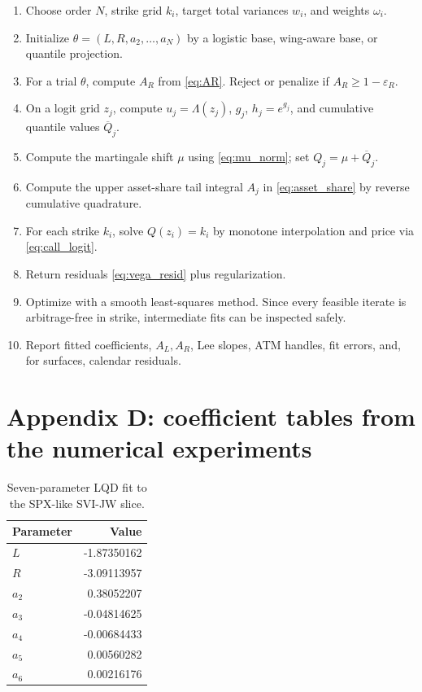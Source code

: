 \documentclass[11pt]{article}
\newcommand{\1}{\mathbf{1}}
\newcommand{\eps}{\varepsilon}
\begin{document}
\begin{enumerate}[leftmargin=2.4em]
\item Choose order $N$, strike grid $k_i$, target total variances $w_i$, and weights $\omega_i$.
\item Initialize $\theta=(L,R,a_2,\ldots,a_N)$ by a logistic base, wing-aware base, or quantile projection.
\item For a trial $\theta$, compute $A_R$ from \eqref{eq:AR}.  Reject or penalize if $A_R\ge1-\eps_R$.
\item On a logit grid $z_j$, compute $u_j=\Lambda(z_j)$, $g_j$, $h_j=e^{g_j}$, and cumulative quantile values $\overline Q_j$.
\item Compute the martingale shift $\mu$ using \eqref{eq:mu_norm}; set $Q_j=\mu+\overline Q_j$.
\item Compute the upper asset-share tail integral $A_j$ in \eqref{eq:asset_share} by reverse cumulative quadrature.
\item For each strike $k_i$, solve $Q(z_i)=k_i$ by monotone interpolation and price via \eqref{eq:call_logit}.
\item Return residuals \eqref{eq:vega_resid} plus regularization.
\item Optimize with a smooth least-squares method.  Since every feasible iterate is arbitrage-free in strike, intermediate fits can be inspected safely.
\item Report fitted coefficients, $A_L,A_R$, Lee slopes, ATM handles, fit errors, and, for surfaces, calendar residuals.
\end{enumerate}

\section{Appendix D: coefficient tables from the numerical experiments}

\begin{longtable}{lr}
\caption{Seven-parameter LQD fit to the SPX-like SVI-JW slice.}\label{tab:svi_coeffs}\\
\toprule
Parameter & Value\\
\midrule
$L$ & -1.87350162\\
$R$ & -3.09113957\\
$a_2$ & 0.38052207\\
$a_3$ & -0.04814625\\
$a_4$ & -0.00684433\\
$a_5$ & 0.00560282\\
$a_6$ & 0.00216176\\
\bottomrule
\end{longtable}
\end{document}
